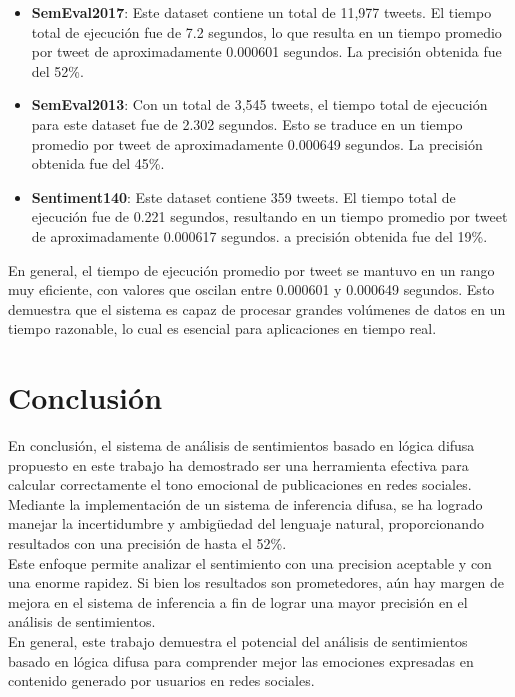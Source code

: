 \documentclass[sigconf, review=false, nonacm]{acmart}
\begin{document}
\begin{itemize}
	\item \textbf{SemEval2017}: Este dataset contiene un total de 11,977 tweets. El tiempo total
	      de ejecución fue de 7.2 segundos, lo que resulta en un tiempo promedio por tweet de
	      aproximadamente 0.000601 segundos. La precisión obtenida fue del 52\%.

	\item \textbf{SemEval2013}: Con un total de 3,545 tweets, el tiempo total de ejecución para este
	      dataset fue de 2.302 segundos. Esto se traduce en un tiempo promedio por tweet de
	      aproximadamente 0.000649 segundos. La precisión obtenida fue del 45\%.

	\item \textbf{Sentiment140}: Este dataset contiene 359 tweets. El tiempo total de ejecución
	      fue de 0.221 segundos, resultando en un tiempo promedio por tweet de aproximadamente 0.000617 segundos.
	      a precisión obtenida fue del 19\%.
\end{itemize}

En general, el tiempo de ejecución promedio por tweet se mantuvo en un rango muy eficiente, con valores que oscilan entre 0.000601 y 0.000649 segundos. Esto demuestra que el sistema es capaz de procesar grandes volúmenes de datos en un tiempo razonable, lo cual es esencial para aplicaciones en tiempo real.

\section{Conclusión}
En conclusión, el sistema de análisis de sentimientos basado en lógica difusa propuesto en este trabajo ha
demostrado ser una herramienta efectiva para calcular correctamente el tono emocional de publicaciones en
redes sociales. Mediante la implementación de un sistema de inferencia difusa, se ha logrado manejar la
incertidumbre y ambigüedad del lenguaje natural, proporcionando resultados con una precisión de hasta el
52\%.\\

Este enfoque permite analizar el sentimiento con una precision aceptable y con una enorme rapidez. Si bien los
resultados son prometedores, aún hay margen de mejora en el sistema de inferencia a fin de lograr una mayor
precisión en el análisis de sentimientos.\\

En general, este trabajo demuestra el potencial del análisis de sentimientos basado en lógica difusa para
comprender mejor las emociones expresadas en contenido generado por usuarios en redes sociales.

\nocite{libro, libro2}


\end{document}

